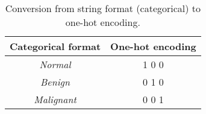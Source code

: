\begin{table}[h]
\centering
\begin{tabular}{|c|c|}
\hline
\textbf{Categorical format} & \textbf{One-hot encoding} \\ \hline
\textit{Normal}             & 1 0 0            \\ \hline
\textit{Benign}             & 0 1 0            \\ \hline
\textit{Malignant}          & 0 0 1            \\ \hline
\end{tabular}
\caption{Conversion from string format (categorical) to one-hot encoding.}
\label{tab:one-hot-encoding-example}
\end{table}